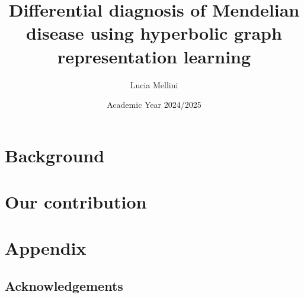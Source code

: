 \documentclass[a4paper, dottedtoc]{book}
\title{Differential diagnosis of Mendelian disease using hyperbolic graph representation learning}
\author{Lucia Mellini}
\date{Academic Year 2024/2025}
\begin{document}
\tikzifexternalizing{}{}


\maketitle

\frontmatter

\tableofcontents
   
\mainmatter
\setcounter{chapter}{-1}

\part*{\large Background}




\part*{\large Our contribution}

% 


\appendix
\cleardoublepage
\part*{\large Appendix}




\chapter*{Acknowledgements}
\end{document}
